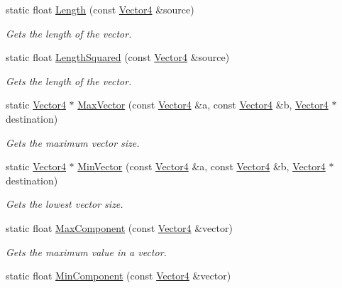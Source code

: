 \begin{DoxyCompactItemize}
static float \hyperlink{class_flounder_1_1_vector4_aa528f9b9a211a3bef6db3ac88b3ad4f4}{Length} (const \hyperlink{class_flounder_1_1_vector4}{Vector4} \&source)
\begin{DoxyCompactList}\small\item\em Gets the length of the vector. \end{DoxyCompactList}\item 
static float \hyperlink{class_flounder_1_1_vector4_aa79739bf79c023aad3ad49ddf5c7e6f2}{Length\+Squared} (const \hyperlink{class_flounder_1_1_vector4}{Vector4} \&source)
\begin{DoxyCompactList}\small\item\em Gets the length of the vector. \end{DoxyCompactList}\item 
static \hyperlink{class_flounder_1_1_vector4}{Vector4} $\ast$ \hyperlink{class_flounder_1_1_vector4_a86ca1c12f3033897e4f4ba532061d7c4}{Max\+Vector} (const \hyperlink{class_flounder_1_1_vector4}{Vector4} \&a, const \hyperlink{class_flounder_1_1_vector4}{Vector4} \&b, \hyperlink{class_flounder_1_1_vector4}{Vector4} $\ast$destination)
\begin{DoxyCompactList}\small\item\em Gets the maximum vector size. \end{DoxyCompactList}\item 
static \hyperlink{class_flounder_1_1_vector4}{Vector4} $\ast$ \hyperlink{class_flounder_1_1_vector4_ad5dc758c92bea8408b312723c7b09eec}{Min\+Vector} (const \hyperlink{class_flounder_1_1_vector4}{Vector4} \&a, const \hyperlink{class_flounder_1_1_vector4}{Vector4} \&b, \hyperlink{class_flounder_1_1_vector4}{Vector4} $\ast$destination)
\begin{DoxyCompactList}\small\item\em Gets the lowest vector size. \end{DoxyCompactList}\item 
static float \hyperlink{class_flounder_1_1_vector4_ab19aaf6f1418fc42c4855d4843fe018c}{Max\+Component} (const \hyperlink{class_flounder_1_1_vector4}{Vector4} \&vector)
\begin{DoxyCompactList}\small\item\em Gets the maximum value in a vector. \end{DoxyCompactList}\item 
static float \hyperlink{class_flounder_1_1_vector4_a615c4a19fe4a4d47970c452262e6f3c8}{Min\+Component} (const \hyperlink{class_flounder_1_1_vector4}{Vector4} \&vector)

\end{DoxyCompactItemize}
